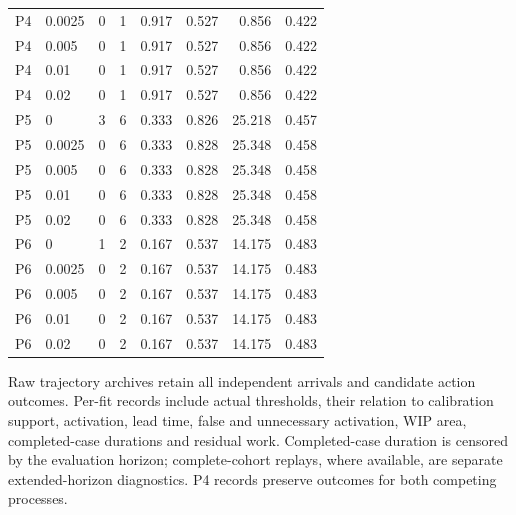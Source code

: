 \begin{longtable}{llrrrrrr}
P4 & 0.0025 & 0 & 1 & 0.917 & 0.527 & 0.856 & 0.422\\

P4 & 0.005 & 0 & 1 & 0.917 & 0.527 & 0.856 & 0.422\\

P4 & 0.01 & 0 & 1 & 0.917 & 0.527 & 0.856 & 0.422\\

P4 & 0.02 & 0 & 1 & 0.917 & 0.527 & 0.856 & 0.422\\

P5 & 0 & 3 & 6 & 0.333 & 0.826 & 25.218 & 0.457\\

P5 & 0.0025 & 0 & 6 & 0.333 & 0.828 & 25.348 & 0.458\\

P5 & 0.005 & 0 & 6 & 0.333 & 0.828 & 25.348 & 0.458\\

P5 & 0.01 & 0 & 6 & 0.333 & 0.828 & 25.348 & 0.458\\

P5 & 0.02 & 0 & 6 & 0.333 & 0.828 & 25.348 & 0.458\\

P6 & 0 & 1 & 2 & 0.167 & 0.537 & 14.175 & 0.483\\

P6 & 0.0025 & 0 & 2 & 0.167 & 0.537 & 14.175 & 0.483\\

P6 & 0.005 & 0 & 2 & 0.167 & 0.537 & 14.175 & 0.483\\

P6 & 0.01 & 0 & 2 & 0.167 & 0.537 & 14.175 & 0.483\\

P6 & 0.02 & 0 & 2 & 0.167 & 0.537 & 14.175 & 0.483\\

\bottomrule\end{longtable}\endgroup

Raw trajectory archives retain all independent arrivals and candidate action outcomes. Per-fit records include actual thresholds, their relation to calibration support, activation, lead time, false and unnecessary activation, WIP area, completed-case durations and residual work. Completed-case duration is censored by the evaluation horizon; complete-cohort replays, where available, are separate extended-horizon diagnostics. P4 records preserve outcomes for both competing processes.


